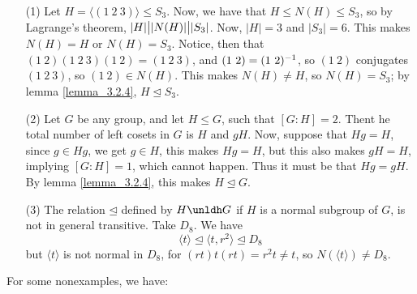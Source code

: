 \begin{example}\label{example_3.5}
  \begin{enumerate}
    \item[(1)] Let $H=\langle (1 \ 2 \ 3) \rangle \leq S_3$. Now, we have that
      $H \leq N(H) \leq S_3$, so by Lagrange's theorem, $|H| \big{|}
      |N(H)| \big{|} |S_3|$. Now, $|H|=3$ and $|S_3|=6$.
      This makes $N(H)=H$ or $N(H)=S_3$. Notice, then that $(1 \ 2)(1 \ 2
      \ 3)(1 \ 2)=(1 \ 2 \ 3)$, and $(1 \ 2)=(1 \ 2)^{-1}$, so $(1 \ 2)$
      conjugates $(1 \ 2 \ 3)$, so $(1 \ 2) \in N(H)$. This makes $N(H)
      \neq H$, so $N(H)=S_3$; by lemma \ref{lemma_3.2.4}, $H \unlhd S_3$.

    \item[(2)] Let $G$ be any group, and let  $H \leq G$, such that
      $[G:H]=2$. Thent he total number of left cosets in $G$ is  $H$ and
      $gH$. Now, suppose that  $Hg=H$, since $g \in Hg$, we get $g \in H$,
      this makes  $Hg=H$, but this also makes $gH=H$, implying  $[G:H]=1$,
      which cannot happen. Thus it must be that $Hg=gH$. By lemma
      \ref{lemma_3.2.4}, this makes $H \unlhd G$.

    \item[(3)] The relation $\unlhd$ defined by $H \unldh G$ if  $H$ is a
      normal subgroup of  $G$, is not in general transitive. Take $D_8$.
      We have
      \begin{equation*}
        \langle t \rangle \unlhd \langle t,r^2 \rangle \unlhd D_8
      \end{equation*}
      but $\langle t \rangle$ is not normal in $ D_8$, for $(rt)t(rt)=r^2t \neq
      t$, so $N(\langle t \rangle) \neq D_8$.
  \end{enumerate}
\end{example}

For some nonexamples, we have:

